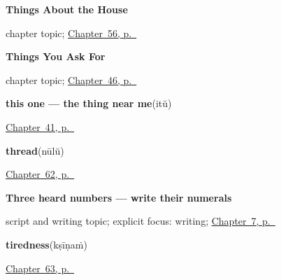 \noindent\begin{minipage}[t]{\linewidth}
\raggedright
\textbf{Things About the House}\par
\footnotesize chapter topic; \hyperref[ch:ml-things-about-the-house]{Chapter~56, p.~\pageref*{ch:ml-things-about-the-house}}
\end{minipage}\par\smallskip

\noindent\begin{minipage}[t]{\linewidth}
\raggedright
\textbf{Things You Ask For}\par
\footnotesize chapter topic; \hyperref[ch:ml-ask-for]{Chapter~46, p.~\pageref*{ch:ml-ask-for}}
\end{minipage}\par\smallskip

\noindent\begin{minipage}[t]{\linewidth}
\raggedright
\textbf{this one — the thing near me}\enspace\emph{}\enspace(itŭ)\par
\footnotesize \hyperref[ch:ml-pointing-and-asking]{Chapter~41, p.~\pageref*{ch:ml-pointing-and-asking}}
\end{minipage}\par\smallskip

\noindent\begin{minipage}[t]{\linewidth}
\raggedright
\textbf{thread}\enspace\emph{}\enspace(nūlŭ)\par
\footnotesize \hyperref[ch:ml-made-by-hand]{Chapter~62, p.~\pageref*{ch:ml-made-by-hand}}
\end{minipage}\par\smallskip

\noindent\begin{minipage}[t]{\linewidth}
\raggedright
\textbf{Three heard numbers — write their numerals}\par
\footnotesize script and writing topic; explicit focus: writing; \hyperref[ch:ml-numbers-one-to-ten]{Chapter~7, p.~\pageref*{ch:ml-numbers-one-to-ten}}
\end{minipage}\par\smallskip

\noindent\begin{minipage}[t]{\linewidth}
\raggedright
\textbf{tiredness}\enspace\emph{}\enspace(kṣīṇaṁ)\par
\footnotesize \hyperref[ch:ml-how-the-body-reports]{Chapter~63, p.~\pageref*{ch:ml-how-the-body-reports}}
\end{minipage}\par\smallskip

